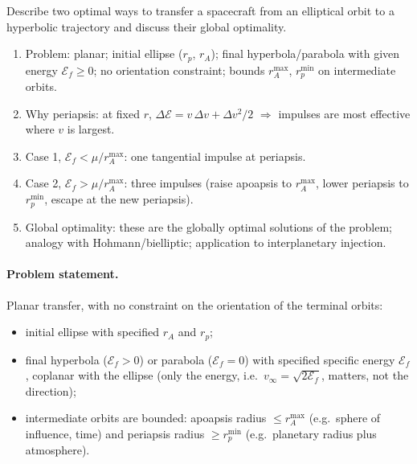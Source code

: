 
\begin{qbox}
Describe two optimal ways to transfer a spacecraft from an elliptical orbit to a hyperbolic trajectory and discuss their
global optimality.
\end{qbox}

\begin{outline}
\begin{enumerate}
\item Problem: planar; initial ellipse ($r_p$, $r_A$); final hyperbola/parabola with given energy $\mathcal E_f\ge0$; no orientation constraint;
bounds $r_A^{\max}$, $r_p^{\min}$ on intermediate orbits.
\item Why periapsis: at fixed $r$, $\Delta\mathcal E=v\,\Delta v+\Delta v^2/2$ $\Rightarrow$ impulses are most effective where $v$ is largest.
\item Case 1, $\mathcal E_f<\mu/r_A^{\max}$: one tangential impulse at periapsis.
\item Case 2, $\mathcal E_f>\mu/r_A^{\max}$: three impulses (raise apoapsis to $r_A^{\max}$, lower periapsis to $r_p^{\min}$, escape at the new periapsis).
\item Global optimality: these are the globally optimal solutions of the problem; analogy with Hohmann/bielliptic; application to interplanetary injection.
\end{enumerate}
\end{outline}

\answer
\paragraph{Problem statement.} Planar transfer, with no constraint on the orientation of the terminal orbits:
\begin{itemize}
\item initial ellipse with specified $r_A$ and $r_p$;
\item final hyperbola ($\mathcal E_f>0$) or parabola ($\mathcal E_f=0$) with specified specific energy $\mathcal E_f$,
coplanar with the ellipse (only the energy, i.e.\ $v_\infty=\sqrt{2\mathcal E_f}$, matters, not the direction);
\item intermediate orbits are bounded: apoapsis radius $\le r_A^{\max}$ (e.g.\ sphere of influence, time) and periapsis radius
$\ge r_p^{\min}$ (e.g.\ planetary radius plus atmosphere).
\end{itemize}

